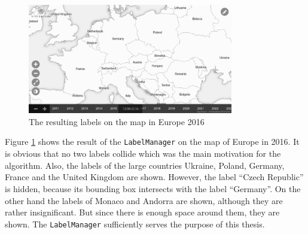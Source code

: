 \begin{figure}[ht]
  \centering
  \includegraphics[width=0.8\textwidth]{graphics/development/application/label_manager.png}
  \caption{The resulting labels on the map in Europe 2016}
  \label{fig:label_manager}
\end{figure}

Figure \ref{fig:label_manager} shows the result of the \texttt{LabelManager} on the map of Europe in 2016. It is obvious that no two labels collide which was the main motivation for the algorithm. Also, the labels of the large countries Ukraine, Poland, Germany, France and the United Kingdom are shown. However, the label ``Czech Republic'' is hidden, because its bounding box intersects with the label ``Germany''. On the other hand the labels of Monaco and Andorra are shown, although they are rather insignificant. But since there is enough space around them, they are shown. The \texttt{LabelManager} sufficiently serves the purpose of this thesis.



